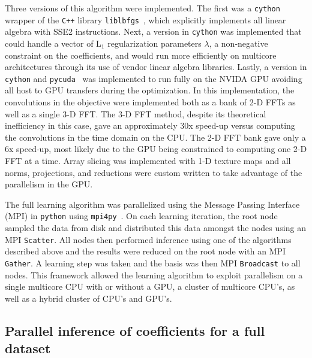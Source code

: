 \documentclass[10pt]{article}
\begin{document}
Three versions of this algorithm were implemented. The first was a
\texttt{cython}\cite{behnel2011cython,seljebotn2009fast} wrapper of
the \verb!C++! library \texttt{liblbfgs}~\cite{liblbfgs}, which
explicitly implements all linear algebra with SSE2 instructions. Next,
a version in \texttt{cython} was implemented that could handle a
vector of L$_1$ regularization parameters $\lambda$, a non-negative
constraint on the coefficients, and would run more efficiently on
multicore architectures through its use of vendor linear algebra
libraries. Lastly, a version in \texttt{cython} and
\texttt{pycuda}~\cite{pycuda} was implemented to run fully on the
NVIDA GPU avoiding all host to GPU transfers during the
optimization. In this implementation, the convolutions in the
objective were implemented both as a bank of 2-D FFTs as well as a
single 3-D FFT. The 3-D FFT method, despite its theoretical
inefficiency in this case, gave an approximately 30x speed-up versus
computing the convolutions in the time domain on the CPU. The 2-D FFT
bank gave only a 6x speed-up, most likely due to the GPU being
constrained to computing one 2-D FFT at a time. Array slicing was
implemented with 1-D texture maps and all norms, projections, and
reductions were custom written to take advantage of the parallelism in
the GPU.

The full learning algorithm was parallelized using the Message Passing
Interface (MPI) in \texttt{python} using
\texttt{mpi4py}~\cite{seljebotn2009fast}. On each learning iteration,
the root node sampled the data from disk and distributed this data
amongst the nodes using an MPI \texttt{Scatter}. All nodes then
performed inference using one of the algorithms described above and
the results were reduced on the root node with an MPI
\texttt{Gather}. A learning step was taken and the basis was then MPI
\texttt{Broadcast} to all nodes. This framework allowed the learning
algorithm to exploit parallelism on a single multicore CPU with or
without a GPU, a cluster of multicore CPU's, as well as a hybrid
cluster of CPU's and GPU's.

\subsection{Parallel inference of coefficients for a full dataset}
\label{sec:parallelblock}
\end{document}
